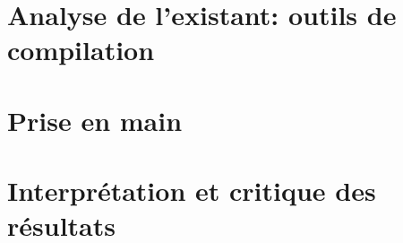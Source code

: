 \section{Analyse de l'existant: outils de compilation}
\paragraph{}

\section{Prise en main}
\section{Interprétation et critique des résultats}
\subparagraph{}
